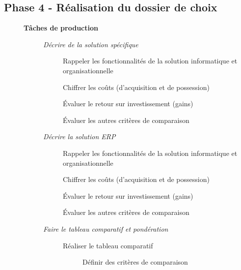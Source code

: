 \subsection{Phase 4 - Réalisation du dossier de choix}

\begin{description}
    \item[] \bf{Tâches de production}
        \begin{description}
            \item[\textbullet] \it{Décrire de la solution spécifique}
                \begin{description}
                    \item[\textbullet] Rappeler les fonctionnalités de la solution informatique et organisationnelle
                    \item[\textbullet] Chiffrer les coûts (d'acquisition et de possession)
                    \item[\textbullet] Évaluer le retour sur investissement (gains)
                    \item[\textbullet] Évaluer les autres critères de comparaison
                \end{description}
            \item[\textbullet] \it{Décrire la solution ERP}
                \begin{description}
                    \item[\textbullet] Rappeler les fonctionnalités de la solution informatique et organisationnelle
                    \item[\textbullet] Chiffrer les coûts (d'acquisition et de possession)
                    \item[\textbullet] Évaluer le retour sur investissement (gains)
                    \item[\textbullet] Évaluer les autres critères de comparaison
                \end{description}
            \item[\textbullet] \it{Faire le tableau comparatif et pondération}
                \begin{description}
                    \item[\textbullet] Réaliser le tableau comparatif
                        \begin{description}
                            \item[\textbullet] Définir des critères de comparaison

\end{description}
\end{description}
\end{description}
\end{description}
